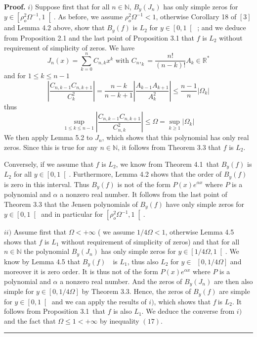 \documentclass{article}
\newenvironment{proof}[1][Proof]{\textbf{#1.} }{\ \rule{0.5em}{0.5em}}
\begin{document}
\begin{proof}
\bigskip $i)$ Suppose first that for all $n\in \mathbb{N}$, $B_{y}\left(
J_{n}\right) $ has only simple zeros for $y\in \left[ \rho _{o}^{2}\Omega
^{-1},1\right[ $. As before, we assume $\rho _{o}^{2}\Omega ^{-1}<1$,
otherwise Corollary 18 of $\left[ 3\right] $ and Lemma 4.2 above, show that $B_{y}\left( f\right) $ is $L_{2}$ for $y\in \left[ 0,1\right[ $ ; and we
deduce from Proposition 2.1 and the last point of Proposition 3.1 that $f$
is $L_{2}$ without requirement of simplicity of zeros. We have 
\begin{equation*}
J_{n}\left( x\right) =\sum\limits_{k=0}^{n}C_{n,k}x^{k}\text{ with }C_{n},_{k}=\dfrac{n!}{\left( n-k\right) !}A_{k}\in \mathbb{R}^{\ast }
\end{equation*}
and for $1\leq k\leq n-1$\begin{equation*}
\left| \dfrac{C_{n,k-1}C_{n,k+1}}{C_{k}^{2}}\right| =\dfrac{n-k}{n-k+1}\left| \dfrac{A_{k-1}A_{k+1}}{A_{k}^{2}}\right| \leq \dfrac{n-1}{n}\left|
\Omega _{k}\right| 
\end{equation*}
thus 
\begin{equation*}
\sup_{1\leq k\leq n-1}\left| \dfrac{C_{n,k-1}C_{n,k+1}}{C_{n,k}^{2}}\right|
\leq \Omega =\sup_{k\geq 1}\left| \Omega _{k}\right| 
\end{equation*}
We then apply Lemma 5.2 to $J_{n}$, which shows that this polynomial has
only real zeros. Since this is true for any $n\in \mathbb{N}$, it follows
from Theorem 3.3 that $f$ is $L_{2}$.

Conversely, if we assume that $f$ is $L_{2}$, we know from Theorem 4.1\ that 
$B_{y}\left( f\right) $ is $L_{2}$ for all $y\in \left[ 0,1\right[ $.
Furthermore, Lemma 4.2 shows that the order of $B_{y}\left( f\right) $ is
zero in this interval. Thus $B_{y}\left( f\right) $ is not of the form $P\left( x\right) e^{\alpha x}$ where $P$ is a polynomial and $\alpha $ a
nonzero real number. It follows from the last point of Theorem 3.3 that the
Jensen polynomials of $B_{y}\left( f\right) $ have only simple zeros for $y\in \left[ 0,1\right[ $ and in particular for $\left[ \rho _{o}^{2}\Omega
^{-1},1\right[ $.

$ii)$ Assume first that $\Omega <+\infty $ ( we assume $1/4\Omega <1$,
otherwise Lemma 4.5 shows that $f$ is $L_{1}$ without requirement of
simplicity of zeros) and that for all $n\in \mathbb{N}$ the polynomial $B_{y}\left( J_{n}\right) $ has only simple zeros for $y\in \left[ 1/4\Omega
,1\right[ $. We know by Lemma 4.5 that $B_{y}\left( f\right) $\ \ is $L_{1}$, thus also $L_{2}$ for $y\in $\ $\left[ 0,1/4\Omega \right] $ and moreover
it is zero order. It is thus not of the form $P\left( x\right) e^{\alpha x}$
where $P$ is a polynomial and $\alpha $ a nonzero real number. And the zeros
of $B_{y}\left( J_{n}\right) $ are then also simple for $y\in \left[
0,1/4\Omega \right] $ by Theorem 3.3. Hence, the zeros of $B_{y}\left(
f\right) $ are simple for $y\in \left[ 0,1\right[ $ and we can apply the
results of $i)$, which shows that $f\ $is $L_{2}$. It follows from
Proposition 3.1\ that $f$ is also $L_{1}$. We deduce the converse from $i)$
and the fact that $\Omega \leq 1<+\infty $ by inequality $\left( 17\right) $.
\end{proof}
\end{document}
